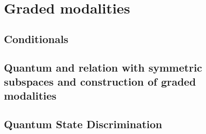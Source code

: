 \chapter{Graded modalities}



\section{Conditionals}

\section{Quantum and relation with symmetric subspaces and construction of graded modalities}

\section{Quantum State Discrimination}
